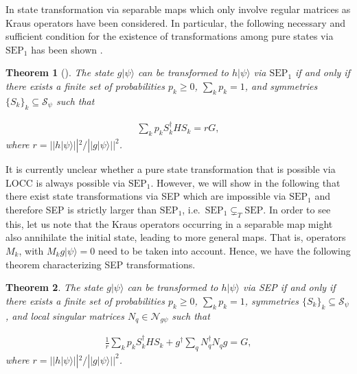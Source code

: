 \documentclass[superscriptaddress,twocolumn]{revtex4}\usepackage[utf8]{inputenc}
\newtheorem{theorem}{Theorem}
\newcommand{\ket}[1]{|#1\rangle}
\begin{document}
In \cite{GoWa11} state transformation via separable maps  which  only involve regular matrices as Kraus operators have been considered.  In particular, the following necessary and sufficient condition for the existence of transformations among pure states via $\textrm{SEP}_1$ has been shown \cite{GoWa11}.
\begin{theorem}[\cite{GoWa11}]
The state $g \ket{\psi}$ can be transformed to $h \ket{\psi}$ via $\textrm{SEP}_1$ if and only if there exists a finite set of probabilities $p_k \geq 0$, $\sum_k p_k = 1$, and symmetries $\{S_k\}_k \subseteq \mathcal{S}_{\psi}$ such that

\begin{align}
\label{eq:sep}
\sum_{k} p_k S_k^\dagger H S_k = r G,
\end{align}
where $r = ||h\ket{\psi}||^2 / ||g\ket{\psi}||^2$.

\end{theorem}

It is currently unclear whether a pure state transformation that is possible via LOCC is always possible via $\textrm{SEP}_1$. However, we will show in the following that there exist state transformations via SEP which are impossible via $\textrm{SEP}_1$ and therefore SEP is strictly larger than $\textrm{SEP}_1$, i.e.\ $\textrm{SEP}_1\subsetneq_T \textrm{SEP}$. In order to see this, let us note that the Kraus operators occurring in a separable map might also annihilate the initial state, leading to more general maps. That is, operators $M_k$, with $M_k g \ket{\psi} = 0$ need to be taken into account. Hence, we have the following theorem characterizing SEP transformations.

\begin{theorem}
\label{ThSEP}
The state $g \ket{\psi}$ can be transformed to $h \ket{\psi}$ via SEP if and only if there exists a finite set of probabilities $p_k \geq 0$, $\sum_k p_k = 1$, symmetries $\{S_k\}_k \subseteq \mathcal{S}_\psi$, and local singular matrices $N_q \in \mathcal{N}_{g \psi}$ such that

\begin{align}
\label{eq:SEP}
 \frac{1}{r} \sum_{k} p_k S_k^\dagger H S_k  + g^\dagger \sum_q   N_q^\dagger N_q g =G,
\end{align}
where $r = ||h\ket{\psi}||^2 / ||g\ket{\psi}||^2$.

\end{theorem}
\end{document}
